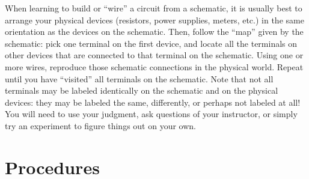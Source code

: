 \documentclass[12pt]{article}
\begin{document}
When learning to build or ``wire'' a circuit from a schematic, it is
usually best to arrange your physical devices (resistors, power
supplies, meters, etc.) in the same orientation as the devices on the
schematic.  Then, follow the ``map'' given by the schematic: pick one
terminal on the first device, and locate all the terminals on other
devices that are connected to that terminal on the schematic.  Using
one or more wires, reproduce those schematic connections in the
physical world.  Repeat until you have ``visited'' all terminals on
the schematic.  Note that not all terminals may be labeled identically
on the schematic and on the physical devices: they may be labeled the
same, differently, or perhaps not labeled at all!  You will need to
use your judgment, ask questions of your instructor, or simply try an
experiment to figure things out on your own.

\section{Procedures}
\label{sec:procedures}
\end{document}

